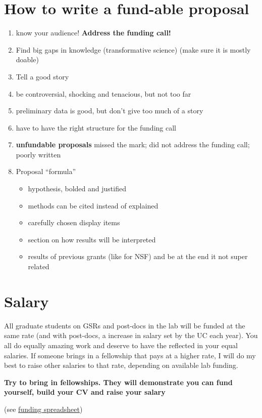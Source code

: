\documentclass[12pt]{article}
\begin{document}
\section{How to write a fund-able proposal}

\begin{enumerate}
\item know your audience! \textbf{Address the funding call!}
\item Find big gaps in knowledge (transformative science) (make sure
  it is mostly doable)
\item Tell a good story
\item be controversial, shocking and tenacious, but not too far
\item preliminary data is good, but don't give too much of a story
\item have to have the right structure for the funding call
\item \textbf{unfundable proposals} missed the mark; did not address
  the funding call; poorly written
\item Proposal ``formula''
  \begin{itemize}
  \item hypothesis, bolded and justified
  \item methods can be cited instead of explained
  \item carefully chosen display items
  \item section on how results will be interpreted
  \item results of previous grants (like for NSF) and be at the end it
    not super related
  \end{itemize}
\end{enumerate}

\section{Salary}
All graduate students on GSRs and post-docs in the lab will be funded
at the same rate (and with post-docs, a increase in salary set by the
UC each year). You all do equally amazing work and deserve to have the
reflected in your equal salaries. If someone brings in a fellowship
that pays at a higher rate, I will do my best to raise other salaries
to that rate, depending on available lab funding.

\textbf{Try to bring in fellowships. They will demonstrate you can
  fund yourself, build your CV and raise your salary}

(see \href{https://docs.google.com/spreadsheets/d/1X2Dyz4HW13hsTmNoUvSoMYOmyobVVtfoGtEtdS0LQtI/edit?usp=sharing}{funding
  spreadsheet})
\end{document}
